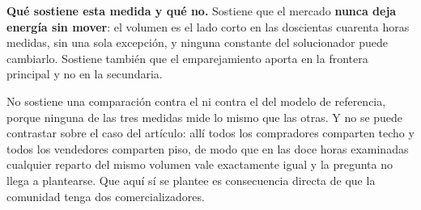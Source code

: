 \begin{detallebox}
\textbf{Qué sostiene esta medida y qué no.} Sostiene que el mercado \textbf{nunca deja energía sin mover}: el volumen es
el lado corto en las doscientas cuarenta horas medidas, sin una sola
excepción, y ninguna constante del solucionador puede cambiarlo. Sostiene
también que el emparejamiento aporta en la frontera principal y no en la
secundaria.

No sostiene una comparación contra el  ni contra el 
del modelo de referencia, porque ninguna de las tres medidas mide lo mismo
que las otras. Y no se puede contrastar sobre el
caso del artículo: allí todos los compradores comparten techo y todos los
vendedores comparten piso, de modo que en las doce horas examinadas
cualquier reparto del mismo volumen vale exactamente igual y la pregunta no
llega a plantearse. Que aquí sí se plantee es consecuencia directa de que la
comunidad tenga dos comercializadores.
\end{detallebox}

